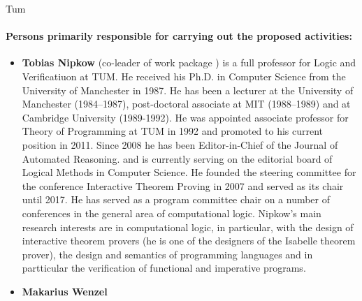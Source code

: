 \begin{sitedescription}{Tum}
\paragraph{Persons primarily responsible for carrying out the proposed activities:}

\begin{itemize}
\item \textbf{Tobias Nipkow} (co-leader of work package
  ) is a full professor for Logic and
  Verificatiuon at TUM. He received his Ph.D. in Computer Science
  from the University of Manchester in 1987.  He has been a
  lecturer at the University of Manchester (1984--1987),
  post-doctoral associate at MIT (1988--1989) and at Cambridge
  University (1989-1992). He was appointed associate professor for Theory of Programming at
  TUM in 1992 and promoted to his current position in 2011. Since 2008
  he has been Editor-in-Chief of the  Journal of Automated Reasoning.
 and is currently serving on the editorial board of Logical Methods in
 Computer Science. He founded the steering committee for the
 conference Interactive Theorem Proving in 2007 and served as its
 chair until 2017.
 He has served as a program committee chair
on a number of conferences in the general area of computational logic.  Nipkow's main research
interests are in computational logic, in particular, with the design of
interactive theorem provers (he is one of the designers of the
Isabelle theorem prover), the design and semantics of programming
languages and in partticular the verification of functional and
imperative programs.
\item \textbf{Makarius Wenzel}
\end{itemize}

\end{sitedescription}

